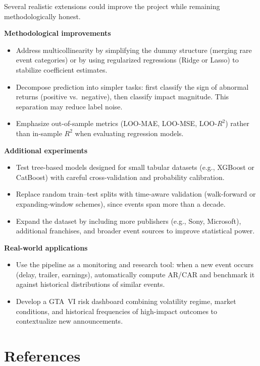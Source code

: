 \documentclass[11pt,a4paper]{article}
\begin{document}
Several realistic extensions could improve the project while remaining methodologically honest.

\textbf{Methodological improvements}
\begin{itemize}[itemsep=0pt, topsep=2pt]
    \item Address multicollinearity by simplifying the dummy structure (merging rare event categories) or by using regularized regressions (Ridge or Lasso) to stabilize coefficient estimates.
    \item Decompose prediction into simpler tasks: first classify the sign of abnormal returns (positive vs.\ negative), then classify impact magnitude. This separation may reduce label noise.
    \item Emphasize out-of-sample metrics (LOO-MAE, LOO-MSE, LOO-$R^2$) rather than in-sample $R^2$ when evaluating regression models.
\end{itemize}

\textbf{Additional experiments}
\begin{itemize}[itemsep=0pt, topsep=2pt]
    \item Test tree-based models designed for small tabular datasets (e.g., XGBoost or CatBoost) with careful cross-validation and probability calibration.
    \item Replace random train--test splits with time-aware validation (walk-forward or expanding-window schemes), since events span more than a decade.
    \item Expand the dataset by including more publishers (e.g., Sony, Microsoft), additional franchises, and broader event sources to improve statistical power.
\end{itemize}

\textbf{Real-world applications}
\begin{itemize}[itemsep=0pt, topsep=2pt]
    \item Use the pipeline as a monitoring and research tool: when a new event occurs (delay, trailer, earnings), automatically compute AR/CAR and benchmark it against historical distributions of similar events.
    \item Develop a GTA~VI risk dashboard combining volatility regime, market conditions, and historical frequencies of high-impact outcomes to contextualize new announcements.
\end{itemize}

\newpage
\section*{References}
\end{document}
